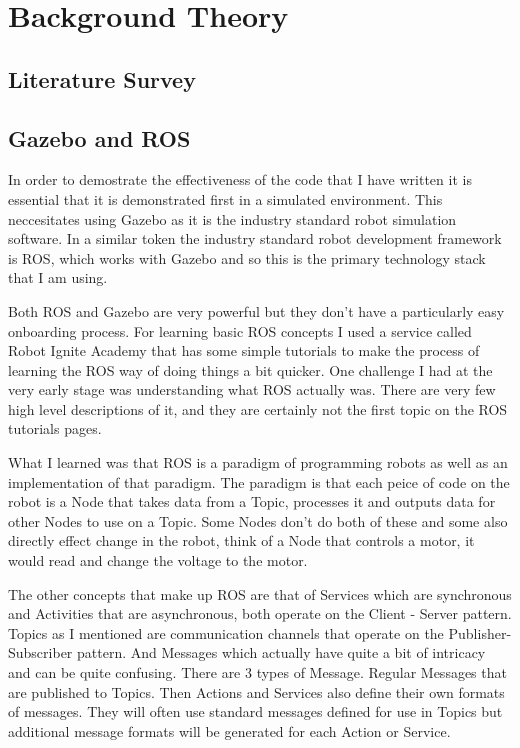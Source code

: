 \documentclass[]{../resources/final_report}
\begin{document}
\chapter{Background Theory}

\section{Literature Survey}


\section{Gazebo and ROS}

In order to demostrate the effectiveness of the code that I have written it is essential that it is 
demonstrated first in a simulated environment. This neccesitates using Gazebo as it is the industry 
standard robot simulation software. In a similar token the industry standard robot development 
framework is ROS, which works with Gazebo and so this is the primary technology stack that I am 
using.

Both ROS and Gazebo are very powerful but they don't have a particularly easy onboarding process. 
For learning basic ROS concepts I used a service called Robot Ignite Academy that has some simple 
tutorials to make the process of learning the ROS way of doing things a bit quicker. One challenge I 
had at the very early stage was understanding what ROS actually was. There are very few high level 
descriptions of it, and they are certainly not the first topic on the ROS tutorials pages.

What I learned was that ROS is a paradigm of programming robots as well as an 
implementation of that paradigm. The paradigm is that each peice of code on the robot is a Node 
that takes data from a Topic, processes it and outputs data for other Nodes to use on a Topic. 
Some Nodes don't do both of these and some also directly effect change in the robot, think of a 
Node that controls a motor, it would read and change the voltage to the motor.

The other concepts that make up ROS are that of Services which are synchronous and Activities that 
are asynchronous, both operate on the Client - Server pattern. Topics as I mentioned are 
communication channels that operate on the Publisher-Subscriber pattern. And Messages which actually 
have quite a bit of intricacy and can be quite confusing. There are 3 types of Message. Regular 
Messages that are published to Topics. Then Actions and Services also define their own formats of 
messages. They will often use standard messages defined for use in Topics but additional message 
formats will be generated for each Action or Service.
\end{document}
